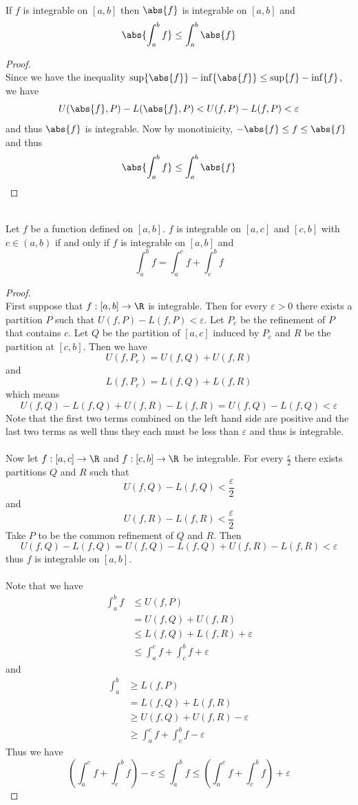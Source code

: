 \documentclass[a4paper]{article}
\begin{document}
\begin{thm}{}{}\\ If $f$ is integrable on $[a,b]$ then $\abs{f}$ is integrable on $[a,b]$ and $$\abs{\int_{a}^{b}f}\leq\int_{a}^{b}\abs{f}$$ \begin{proof}\\ Since we have the inequality $\sup\{\abs{f}\}-\inf\{\abs{f}\}\leq\sup\{f\}-\inf\{f\}$, we have $$U(\abs{f},P)-L(\abs{f},P)<U(f,P)-L(f,P)<\varepsilon$$ and thus $\abs{f}$ is integrable. Now by monotinicity, $-\abs{f}\leq f\leq\abs{f}$ and thus $$\abs{\int_a^bf}\leq\int_a^b\abs{f}$$
\end{proof}
\end{thm}

\begin{thm}{}{}\\ Let $f$ be a function defined on $[a,b]$. $f$ is integrable on $[a,c]$ and $[c,b]$ with $c\in(a,b)$ if and only if $f$ is integrable on $[a,b]$ and $$\int_{a}^{b}f=\int_{a}^{c}f+\int_{c}^{b}f$$ 
\begin{proof}\\ First suppose that $f:[a,b]\to\R$ is integrable. Then for every $\varepsilon>0$ there exists a partition $P$ such that $U(f,P)-L(f,P)<\varepsilon$. Let $P_c$ be the refinement of $P$ that contains $c$. Let $Q$ be the partition of $[a,c]$ induced by $P_c$ and $R$ be the partition at $[c,b]$. Then we have $$U(f,P_c)=U(f,Q)+U(f,R)$$ and $$L(f,P_c)=L(f,Q)+L(f,R)$$ which means $$U(f,Q)-L(f,Q)+U(f,R)-L(f,R)=U(f,Q)-L(f,Q)<\varepsilon$$ Note that the first two terms combined on the left hand side are positive and the last two terms as well thus they each must be less than $\varepsilon$ and thus is integrable. \\~\\
Now let $f:[a,c]\to\R$ and $f:[c,b]\to\R$ be integrable. For every $\frac{\varepsilon}{2}$ there exists partitions $Q$ and $R$ such that $$U(f,Q)-L(f,Q)<\frac{\varepsilon}{2}$$ and $$U(f,R)-L(f,R)<\frac{\varepsilon}{2}$$ Take $P$ to be the common refinement of $Q$ and $R$. Then $$U(f,Q)-L(f,Q)=U(f,Q)-L(f,Q)+U(f,R)-L(f,R)<\varepsilon$$ thus $f$ is integrable on $[a,b]$. \\~\\
Note that we have 
\begin{align*}
\int_a^bf&\leq U(f,P)\\
&=U(f,Q)+U(f,R)\\
&\leq L(f,Q)+L(f,R)+\varepsilon\\
&\leq\int_a^cf+\int_c^bf+\varepsilon
\end{align*} and
\begin{align*}
\int_a^b&\geq L(f,P)\\
&=L(f,Q)+L(f,R)\\
&\geq U(f,Q)+U(f,R)-\varepsilon\\
&\geq\int_a^cf+\int_c^bf-\varepsilon
\end{align*}
Thus we have $$\left(\int_a^cf+\int_c^bf\right)-\varepsilon\leq\int_a^bf\leq\left(\int_a^cf+\int_c^bf\right)+\varepsilon$$
\end{proof}
\end{thm}
\end{document}
